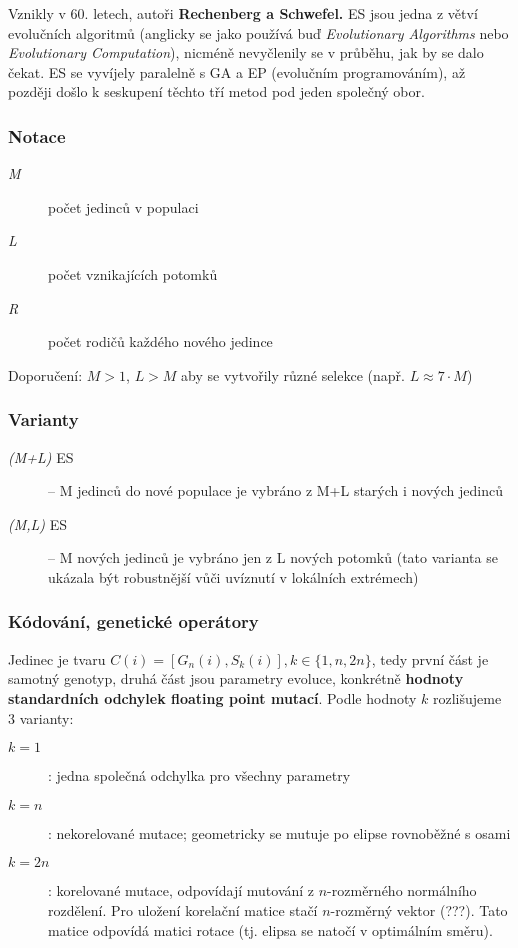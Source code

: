 Vznikly v 60. letech, autoři \textbf{Rechenberg a Schwefel.} ES jsou jedna z větví evolučních algoritmů (anglicky se jako  používá buď \textit{Evolutionary Algorithms} nebo \textit{Evolutionary Computation}), nicméně nevyčlenily se v průběhu, jak by se dalo čekat. ES se vyvíjely paralelně s GA a EP (evolučním programováním), až později došlo k seskupení těchto tří metod pod jeden společný obor.

\subsubsection{Notace}
\begin{description}
	
	
	\item[\textit{M}] počet jedinců v populaci
	\item[\textit{L}] počet vznikajících potomků
	\item[\textit{R}] počet rodičů každého nového jedince
\end{description}
Doporučení: $M > 1$, $L > M$ aby se vytvořily různé selekce (např. $L \approx 7 \cdot M$)

\subsubsection{Varianty}
\begin{description}
	
	
	\item[\textit{(M+L)} ES] -- M jedinců do nové populace je vybráno z M+L starých i nových jedinců
	\item[\textit{(M,L)} ES] -- M nových jedinců je vybráno jen z L nových potomků (tato varianta se ukázala být robustnější vůči uvíznutí v lokálních extrémech)
\end{description}

\subsubsection{Kódování, genetické operátory}
Jedinec je tvaru $C(i) = [G_n(i), S_k(i)], k \in \{1, n, 2n\}$, tedy první část je samotný genotyp, druhá část jsou parametry evoluce, konkrétně \textbf{hodnoty standardních odchylek floating point mutací}. Podle hodnoty $k$ rozlišujeme 3 varianty:
\begin{description}
	
	
	\item[$k=1$]: jedna společná odchylka pro všechny parametry
	\item[$k=n$]: nekorelované mutace; geometricky se mutuje po elipse rovnoběžné s osami
	\item[$k=2n$]: korelované mutace, odpovídají mutování z $n$-rozměrného normálního rozdělení. 
	Pro uložení korelační matice stačí $n$-rozměrný vektor (???). Tato matice odpovídá matici rotace (tj. elipsa se natočí v optimálním směru).
\end{description}

